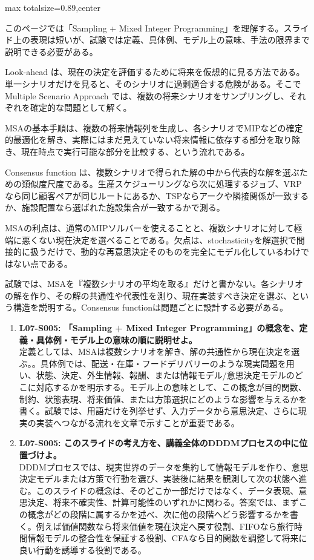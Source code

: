 \begin{minipage}[t]{0.58\textwidth}
\begin{adjustbox}{max totalsize={\textwidth}{0.89\textheight},center}
\begin{minipage}{\textwidth}\scriptsize
{}このページでは「Sampling + Mixed Integer Programming」を理解する。スライド上の表現は短いが、試験では定義、具体例、モデル上の意味、手法の限界まで説明できる必要がある。\par
Look-ahead は、現在の決定を評価するために将来を仮想的に見る方法である。単一シナリオだけを見ると、そのシナリオに過剰適合する危険がある。そこで Multiple Scenario Approach では、複数の将来シナリオをサンプリングし、それぞれを確定的な問題として解く。\par
MSAの基本手順は、複数の将来情報列を生成し、各シナリオでMIPなどの確定的最適化を解き、実際にはまだ見えていない将来情報に依存する部分を取り除き、現在時点で実行可能な部分を比較する、という流れである。\par
Consensus function は、複数シナリオで得られた解の中から代表的な解を選ぶための類似度尺度である。生産スケジューリングなら次に処理するジョブ、VRPなら同じ顧客ペアが同じルートにあるか、TSPならアークや隣接関係が一致するか、施設配置なら選ばれた施設集合が一致するかで測る。\par
MSAの利点は、通常のMIPソルバーを使えることと、複数シナリオに対して極端に悪くない現在決定を選べることである。欠点は、stochasticityを解選択で間接的に扱うだけで、動的な再意思決定そのものを完全にモデル化しているわけではない点である。\par
試験では、MSAを『複数シナリオの平均を取る』だけと書かない。各シナリオの解を作り、その解の共通性や代表性を測り、現在実装すべき決定を選ぶ、という構造を説明する。Consensus functionは問題ごとに設計する必要がある。\par{}\begin{enumerate}\item \textbf{L07-S005: 「Sampling + Mixed Integer Programming」の概念を、定義・具体例・モデル上の意味の順に説明せよ。}\\定義としては、MSAは複数シナリオを解き、解の共通性から現在決定を選ぶ。。具体例では、配送・在庫・フードデリバリーのような現実問題を用い、状態、決定、外生情報、報酬、または情報モデル/意思決定モデルのどこに対応するかを明示する。モデル上の意味として、この概念が目的関数、制約、状態表現、将来価値、または方策選択にどのような影響を与えるかを書く。試験では、用語だけを列挙せず、入力データから意思決定、さらに現実の実装へつながる流れを文章で示すことが重要である。\item \textbf{L07-S005: このスライドの考え方を、講義全体のDDDMプロセスの中に位置づけよ。}\\DDDMプロセスでは、現実世界のデータを集約して情報モデルを作り、意思決定モデルまたは方策で行動を選び、実装後に結果を観測して次の状態へ進む。このスライドの概念は、そのどこか一部だけではなく、データ表現、意思決定、将来不確実性、計算可能性のいずれかに関わる。答案では、まずこの概念がどの段階に属するかを述べ、次に他の段階へどう影響するかを書く。例えば価値関数なら将来価値を現在決定へ戻す役割、FIFOなら旅行時間情報モデルの整合性を保証する役割、CFAなら目的関数を調整して将来に良い行動を誘導する役割である。\end{enumerate}

\end{minipage}
\end{adjustbox}
\end{minipage}
